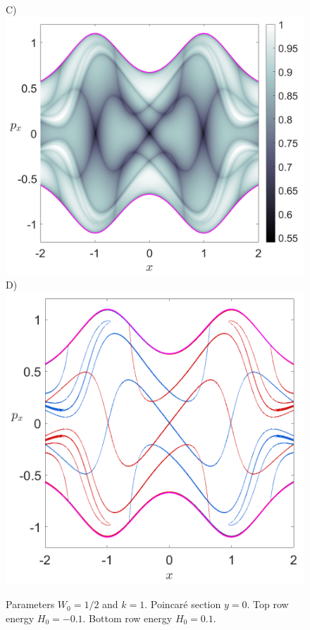 \documentclass[10pt,aps,onecolumn,superscriptaddress]{revtex4-2}
\begin{document}
\begin{figure}[htbp]
	C)\includegraphics[scale=0.28]{H_01_LD_tau_12_y_0.png}
	D)\includegraphics[scale=0.28]{H_01_mani_tau_12_y_0.png}
	\caption{Parameters $W_0 = 1/2$ and $k = 1$. Poincar\'e section $y = 0$. Top row energy $H_0 = -0.1$. Bottom row energy $H_0 = 0.1$.}
	\label{fig:ld_mani_y_0}
\end{figure}
\end{document}
